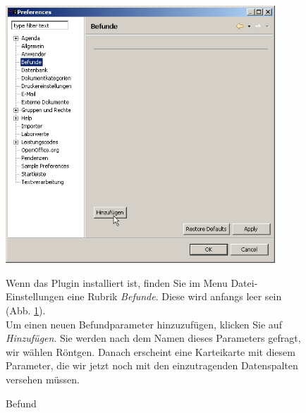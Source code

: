 \begin{figure}[htbp]
   \begin{minipage}{0.35\textwidth}
       \centering
       \includegraphics[width=0.9\textwidth]{images/befunde1}
       \caption{Befund}
       \label{fig:befundesettings}
     \end{minipage}\hfill
     \begin{minipage}{0.65\textwidth}
     Wenn das Plugin installiert ist, finden Sie im Menu Datei-Einstellungen eine Rubrik \textit{Befunde}. Diese wird anfangs leer sein (Abb. \ref{fig:befundesettings}).\\

     Um einen neuen Befundparameter hinzuzufügen, klicken Sie auf  \textit{Hinzufügen}. Sie werden nach dem Namen dieses Parameters gefragt, wir wählen  Röntgen. Danach erscheint eine Karteikarte mit diesem Parameter, die wir jetzt noch mit den einzutragenden Datenspalten versehen müssen.

    \end{minipage}
\end{figure}

